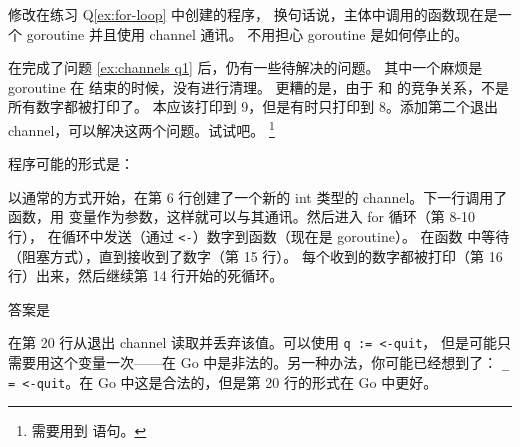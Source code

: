 \begin{Exercise}[title={Channel},difficulty=4]
\label{ex:channels}
\Question\label{ex:channels q1} 修改在练习 Q\ref{ex:for-loop} 中创建的程序，
换句话说，主体中调用的函数现在是一个 goroutine 并且使用 channel 通讯。
不用担心 goroutine 是如何停止的。

\Question\label{ex:channels q2} 在完成了问题 \ref{ex:channels q1} 后，仍有一些待解决的问题。
其中一个麻烦是 goroutine 在  结束的时候，没有进行清理。
更糟的是，由于  和  的竞争关系，不是所有数字都被打印了。
本应该打印到 9，但是有时只打印到 8。添加第二个退出 channel，可以解决这两个问题。试试吧。
\footnote{需要用到  语句。}

\end{Exercise}

\begin{Answer}
\Question 程序可能的形式是： 

以通常的方式开始，在第 6 行创建了一个新的 int 类型的 channel。下一行调用了
 函数，用  变量作为参数，这样就可以与其通讯。然后进入 for 循环（第 8-10 行），
在循环中发送（通过 \lstinline{<-}）数字到函数（现在是 goroutine）。
在函数  中等待（阻塞方式），直到接收到了数字（第 15 行）。
每个收到的数字都被打印（第 16 行）出来，然后继续第 14 行开始的死循环。

\Question 答案是

在第 20 行从退出 channel 读取并丢弃该值。可以使用 \lstinline{q := <-quit}，
但是可能只需要用这个变量一次——在 Go 中是非法的。另一种办法，你可能已经想到了：
\lstinline{_ = <-quit}。在 Go 中这是合法的，但是第 20 行的形式在 Go 中更好。
\end{Answer}
